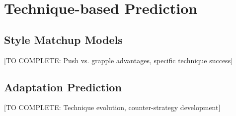 \section{Technique-based Prediction}

\subsection{Style Matchup Models}

[TO COMPLETE: Push vs. grapple advantages, specific technique success]

\subsection{Adaptation Prediction}

[TO COMPLETE: Technique evolution, counter-strategy development]